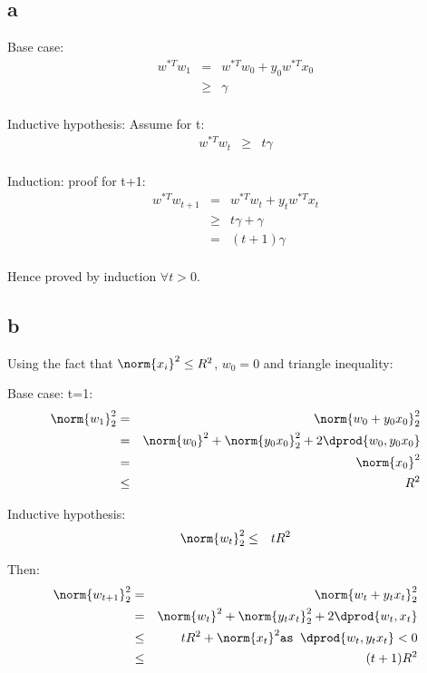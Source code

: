\documentclass{article}
\begin{document}
\subsection{a}
Base case:
\begin{eqnarray*}
w^{*T}w_{1} &=& w^{*T}w_{0} + y_{0}w^{*T}x_{0}\\
&\geq& \gamma\\
\end{eqnarray*}

Inductive hypothesis: Assume for t:
\begin{eqnarray*}
w^{*T}w_{t} &\geq& t\gamma\\
\end{eqnarray*}

Induction: proof for t+1:
\begin{eqnarray*}
w^{*T}w_{t+1} &=& w^{*T}w_{t} + y_{t}w^{*T}x_{t}\\
&\geq& t\gamma + \gamma\\
&=& (t+1)\gamma\\
\end{eqnarray*}

Hence proved by induction $\forall t>0$.

\subsection{b}
Using the fact that $\norm{x_{i}}^{2} \leq R^{2}$, $w_0 = 0$ and triangle inequality:

Base case: t=1:
\begin{eqnarray*}
\norm{w_{1}}_{2}^{2} &=& \norm{w_{0} + y_{0}x_{0}}_{2}^{2}\\
&=& \norm{w_{0}}^{2} + \norm{y_{0}x_{0}}_{2}^{2} + 2\dprod{w_{0}, y_0 x_0}\\
&=& \norm{x_{0}}^{2}\\
&\leq & R^{2}
\end{eqnarray*}

Inductive hypothesis:
\begin{eqnarray*}
\norm{w_{t}}_{2}^{2} &\leq & tR^{2}\\
\end{eqnarray*}

Then:
\begin{eqnarray*}
\norm{w_{t+1}}_{2}^{2} &=& \norm{w_{t} + y_{t}x_{t}}_{2}^{2}\\
&=& \norm{w_{t}}^{2} + \norm{y_{t}x_{t}}_{2}^{2} + 2\dprod{w_{t}, x_t}\\
&\leq & tR^{2} + \norm{x_{t}}^{2} \texttt{as $\dprod{w_{t}, y_t x_t}<0$}\\
&\leq & (t+1)R^{2}\\
\end{eqnarray*}
\end{document}
